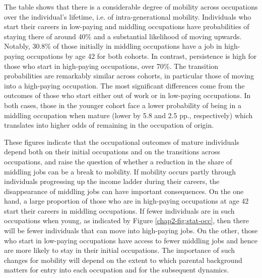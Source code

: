 The table shows that there is a considerable degree of mobility across occupations over the individual's lifetime, i.e. of intra-generational mobility. Individuals who start their careers in low-paying and middling occupations have probabilities of staying there of around 40\% and a substantial likelihood of moving upwards. Notably, 30.8\% of those initially in middling occupations have a job in high-paying occupations by age 42 for both cohorts. In contrast, persistence is high for those who start in high-paying occupations, over 70\%. The transition probabilities are remarkably similar across cohorts, in particular those of moving into a high-paying occupation. The most significant differences come from the outcomes of those who start either out of work or in low-paying occupations. In both cases, those in the younger cohort face a lower probability of being in a middling occupation when mature (lower by 5.8 and 2.5 pp., respectively) which translates into higher odds of remaining in the occupation of origin. 

These figures indicate that the occupational outcomes of mature individuals depend both on their initial occupations and on the transitions across occupations, and raise the question of whether a reduction in the share of middling jobs can be a break to mobility. If mobility occurs partly through individuals progressing up the income ladder during their careers, the disappearance of middling jobs can have important consequences. On the one hand, a large proportion of those who are in high-paying occupations at age 42 start their careers in middling occupations. If fewer individuals are in such occupations when young, as indicated by Figure \ref{chap2-fig:stat-occ}, then there will be fewer individuals that can move into high-paying jobs. On the other, those who start in low-paying occupations have access to fewer middling jobs and hence are more likely to stay in their initial occupations. The importance of such changes for mobility will depend on the extent to which parental background matters for entry into each occupation and for the subsequent dynamics.
